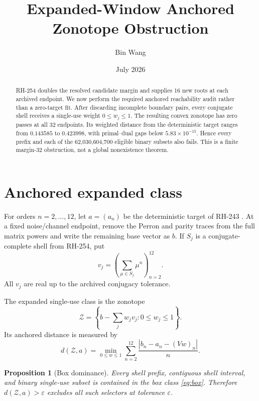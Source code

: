 \documentclass[11pt]{article}
\title{Expanded-Window Anchored Zonotope Obstruction}
\author{Bin Wang}
\date{July 2026}
\newtheorem{proposition}[theorem]{Proposition}
\theoremstyle{remark}
\begin{document}
\maketitle

\begin{abstract}
RH-254 doubles the resolved candidate margin and supplies 16 new roots at
each archived endpoint.  We now perform the required anchored reachability
audit rather than a zero-target fit.  After discarding incomplete boundary
pairs, every conjugate shell receives a single-use weight $0\le w_j\le1$.
The resulting convex zonotope has zero passes at all 32 endpoints.  Its
weighted distance from the deterministic target ranges from $0.143585$ to
$0.423998$, with primal--dual gaps below $5.83\times10^{-15}$.  Hence every
prefix and each of the 62,030,604,700 eligible binary subsets also fails.
This is a finite margin-32 obstruction, not a global nonexistence theorem.
\end{abstract}

\section{Anchored expanded class}

For orders $n=2,\dots,12$, let $a=(a_n)$ be the deterministic target of
RH-243 \citep{WangRH243}.  At a fixed noise/channel endpoint, remove the
Perron and parity traces from the full matrix powers and write the remaining
base vector as $b$.  If $S_j$ is a conjugate-complete shell from RH-254, put
\begin{equation}
 v_j=\left(\sum_{\mu\in S_j}\mu^n\right)_{n=2}^{12}.
 \label{eq:shell}
\end{equation}
All $v_j$ are real up to the archived conjugacy tolerance.

The expanded single-use class is the zonotope
\begin{equation}
 \mathcal Z=\left\{b-\sum_jw_jv_j:0\le w_j\le1\right\}.
 \label{eq:box}
\end{equation}
Its anchored distance is measured by
\begin{equation}
 d(\mathcal Z,a)=\min_{0\le w\le1}
 \sum_{n=2}^{12}\frac{|b_n-a_n-(Vw)_n|}{n}.
 \label{eq:distance}
\end{equation}

\begin{proposition}[Box dominance]
\label{prop:dominance}
Every shell prefix, contiguous shell interval, and binary single-use subset is
contained in the box class \eqref{eq:box}.  Therefore
$d(\mathcal Z,a)>\varepsilon$ excludes all such selectors at tolerance
$\varepsilon$.
\end{proposition}
\end{document}
